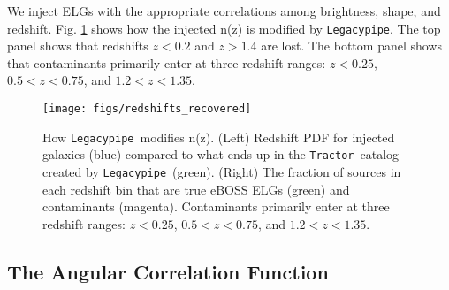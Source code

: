\documentclass[a4paper,fleqn,usenatbib]{mnras}
\newcommand{\tractor}{{\tt Tractor}}
\newcommand{\legacypipe}{{\tt Legacypipe}}
\begin{document}
We inject ELGs with the appropriate correlations among brightness, shape, and redshift. Fig. \ref{fig:redshifts-recovered} shows how the injected n(z) is modified by \legacypipe. The top panel shows that redshifts $z < 0.2$ and $z > 1.4$ are lost. The bottom panel shows that contaminants primarily enter at three redshift ranges: $z < 0.25$, $0.5 < z < 0.75$, and $1.2 < z< 1.35$.

\begin{figure}
 \texttt{[image: figs/redshifts\_recovered]}
 \caption{How \legacypipe\, modifies n(z). (Left) Redshift PDF for injected galaxies (blue) compared to what ends up in the \tractor\, catalog created by \legacypipe\, (green). (Right) The fraction of sources in each redshift bin that are true eBOSS ELGs (green) and contaminants (magenta). Contaminants primarily enter at three redshift ranges: $z < 0.25$, $0.5 < z < 0.75$, and $1.2 < z< 1.35$.}
 \label{fig:redshifts-recovered}
\end{figure}

\subsection{The Angular Correlation Function}
\label{sec:results-cf}
\end{document}
